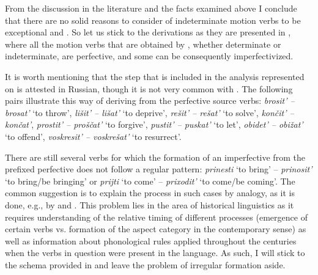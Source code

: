 From the discussion in the literature and the facts examined above I conclude that there are no solid reasons to consider  of indeterminate motion verbs to be exceptional and . So let us stick to the derivations as they are presented in , where all the motion verbs that are obtained by , whether determinate or indeterminate, are perfective, and some can be consequently imperfectivized.

It is worth mentioning that the  step that is included in the analysis represented on  is attested in Russian, though it is not very common with . The following pairs illustrate this way of deriving  from the perfective source verbs: \textit{brosit'\textsuperscript{\PF} -- brosat'\textsuperscript{\IPF}} `to throw', \textit{li\v{s}it'\textsuperscript{\PF} -- li\v{s}at'\textsuperscript{\IPF}} `to deprive', \textit{re\v{s}it'\textsuperscript{\PF} -- re\v{s}at'\textsuperscript{\IPF}} `to solve', \textit{kon\v{c}it'\textsuperscript{\PF} -- kon\v{c}at'\textsuperscript{\IPF}}, \textit{prostit'\textsuperscript{\PF} -- pro\v{s}\v{c}at'\textsuperscript{\IPF}} `to forgive', \textit{pustit'\textsuperscript{\PF} -- puskat'\textsuperscript{\IPF}} `to let', \textit{obidet'\textsuperscript{\PF} -- obi\v{z}at'\textsuperscript{\IPF}} `to offend', \textit{voskresit'\textsuperscript{\PF} -- voskre\v{s}at'\textsuperscript{\IPF}} `to resurrect'.

There are still several verbs for which the formation of an imperfective from the prefixed perfective does not follow a regular pattern: \textit{prinesti}\textsuperscript{\PF} `to bring' -- \textit{prinosit'}\textsuperscript{\IPF} `to bring/be bringing' or \textit{prijti}\textsuperscript{\PF} `to come' -- \textit{prixodit'}\textsuperscript{\IPF} `to come/be coming'. The common suggestion is to explain the  process in such cases by analogy, as it is done, e.g., by \citet{Regnell:44} and \citet[589]{Shvedova:82}. This problem lies in the area of historical linguistics as it requires understanding of the relative timing of different processes (emergence of certain verbs vs. formation of the aspect category in the contemporary sense) as well as information about phonological rules applied throughout the centuries when the verbs in question were present in the language. As such, I will stick to the schema provided in  and leave the problem of irregular  formation aside.


